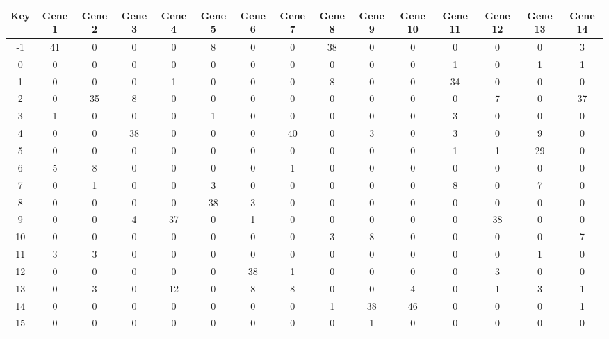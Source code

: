 \begin{tabular}{|c|c|c|c|c|c|c|c|c|c|c|c|c|c|c|}
\hline
Key & Gene 1 & Gene 2 & Gene 3 & Gene 4 & Gene 5 & Gene 6 & Gene 7 & Gene 8 & Gene 9 & Gene 10 & Gene 11 & Gene 12 & Gene 13 & Gene 14 \\
\hline
-1 & 41 & 0 & 0 & 0 & 8 & 0 & 0 & 38 & 0 & 0 & 0 & 0 & 0 & 3 \\
0 & 0 & 0 & 0 & 0 & 0 & 0 & 0 & 0 & 0 & 0 & 1 & 0 & 1 & 1 \\
1 & 0 & 0 & 0 & 1 & 0 & 0 & 0 & 8 & 0 & 0 & 34 & 0 & 0 & 0 \\
2 & 0 & 35 & 8 & 0 & 0 & 0 & 0 & 0 & 0 & 0 & 0 & 7 & 0 & 37 \\
3 & 1 & 0 & 0 & 0 & 1 & 0 & 0 & 0 & 0 & 0 & 3 & 0 & 0 & 0 \\
4 & 0 & 0 & 38 & 0 & 0 & 0 & 40 & 0 & 3 & 0 & 3 & 0 & 9 & 0 \\
5 & 0 & 0 & 0 & 0 & 0 & 0 & 0 & 0 & 0 & 0 & 1 & 1 & 29 & 0 \\
6 & 5 & 8 & 0 & 0 & 0 & 0 & 1 & 0 & 0 & 0 & 0 & 0 & 0 & 0 \\
7 & 0 & 1 & 0 & 0 & 3 & 0 & 0 & 0 & 0 & 0 & 8 & 0 & 7 & 0 \\
8 & 0 & 0 & 0 & 0 & 38 & 3 & 0 & 0 & 0 & 0 & 0 & 0 & 0 & 0 \\
9 & 0 & 0 & 4 & 37 & 0 & 1 & 0 & 0 & 0 & 0 & 0 & 38 & 0 & 0 \\
10 & 0 & 0 & 0 & 0 & 0 & 0 & 0 & 3 & 8 & 0 & 0 & 0 & 0 & 7 \\
11 & 3 & 3 & 0 & 0 & 0 & 0 & 0 & 0 & 0 & 0 & 0 & 0 & 1 & 0 \\
12 & 0 & 0 & 0 & 0 & 0 & 38 & 1 & 0 & 0 & 0 & 0 & 3 & 0 & 0 \\
13 & 0 & 3 & 0 & 12 & 0 & 8 & 8 & 0 & 0 & 4 & 0 & 1 & 3 & 1 \\
14 & 0 & 0 & 0 & 0 & 0 & 0 & 0 & 1 & 38 & 46 & 0 & 0 & 0 & 1 \\
15 & 0 & 0 & 0 & 0 & 0 & 0 & 0 & 0 & 1 & 0 & 0 & 0 & 0 & 0 \\
\hline
\end{tabular}
